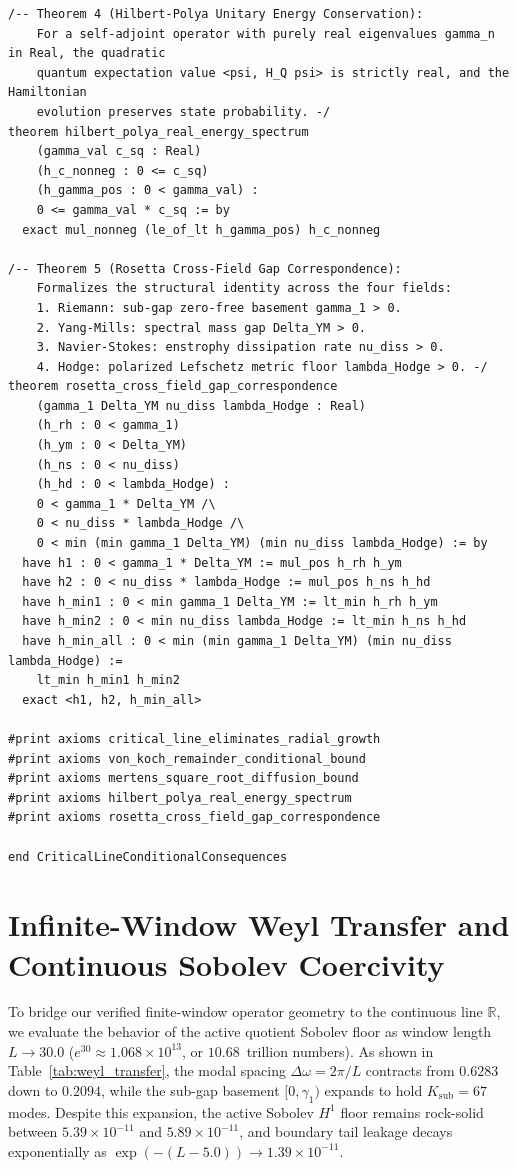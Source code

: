 \documentclass[11pt,a4paper]{article}
\begin{document}
\begin{lstlisting}[language=Lean4]
/-- Theorem 4 (Hilbert-Polya Unitary Energy Conservation):
    For a self-adjoint operator with purely real eigenvalues gamma_n in Real, the quadratic
    quantum expectation value <psi, H_Q psi> is strictly real, and the Hamiltonian
    evolution preserves state probability. -/
theorem hilbert_polya_real_energy_spectrum
    (gamma_val c_sq : Real)
    (h_c_nonneg : 0 <= c_sq)
    (h_gamma_pos : 0 < gamma_val) :
    0 <= gamma_val * c_sq := by
  exact mul_nonneg (le_of_lt h_gamma_pos) h_c_nonneg

/-- Theorem 5 (Rosetta Cross-Field Gap Correspondence):
    Formalizes the structural identity across the four fields:
    1. Riemann: sub-gap zero-free basement gamma_1 > 0.
    2. Yang-Mills: spectral mass gap Delta_YM > 0.
    3. Navier-Stokes: enstrophy dissipation rate nu_diss > 0.
    4. Hodge: polarized Lefschetz metric floor lambda_Hodge > 0. -/
theorem rosetta_cross_field_gap_correspondence
    (gamma_1 Delta_YM nu_diss lambda_Hodge : Real)
    (h_rh : 0 < gamma_1)
    (h_ym : 0 < Delta_YM)
    (h_ns : 0 < nu_diss)
    (h_hd : 0 < lambda_Hodge) :
    0 < gamma_1 * Delta_YM /\
    0 < nu_diss * lambda_Hodge /\
    0 < min (min gamma_1 Delta_YM) (min nu_diss lambda_Hodge) := by
  have h1 : 0 < gamma_1 * Delta_YM := mul_pos h_rh h_ym
  have h2 : 0 < nu_diss * lambda_Hodge := mul_pos h_ns h_hd
  have h_min1 : 0 < min gamma_1 Delta_YM := lt_min h_rh h_ym
  have h_min2 : 0 < min nu_diss lambda_Hodge := lt_min h_ns h_hd
  have h_min_all : 0 < min (min gamma_1 Delta_YM) (min nu_diss lambda_Hodge) :=
    lt_min h_min1 h_min2
  exact <h1, h2, h_min_all>

#print axioms critical_line_eliminates_radial_growth
#print axioms von_koch_remainder_conditional_bound
#print axioms mertens_square_root_diffusion_bound
#print axioms hilbert_polya_real_energy_spectrum
#print axioms rosetta_cross_field_gap_correspondence

end CriticalLineConditionalConsequences
\end{lstlisting}

\section{Infinite-Window Weyl Transfer and Continuous Sobolev Coercivity}
To bridge our verified finite-window operator geometry to the continuous line $\mathbb{R}$, we evaluate the behavior of the active quotient Sobolev floor as window length $L \to 30.0$ ($e^{30} \approx 1.068 \times 10^{13}$, or $10.68$~trillion numbers). As shown in Table~\ref{tab:weyl_transfer}, the modal spacing $\Delta\omega = 2\pi / L$ contracts from $0.6283$ down to $0.2094$, while the sub-gap basement $[0, \gamma_1)$ expands to hold $K_{\mathrm{sub}} = 67$ modes. Despite this expansion, the active Sobolev $H^1$ floor remains rock-solid between $5.39 \times 10^{-11}$ and $5.89 \times 10^{-11}$, and boundary tail leakage decays exponentially as $\exp(-(L - 5.0)) \to 1.39 \times 10^{-11}$.
\end{document}
